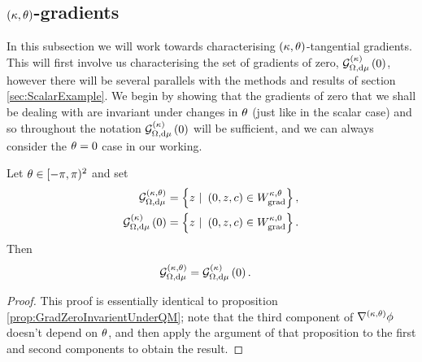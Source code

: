 \subsection{$\left( \kappa,\theta \right)$-gradients} \label{sec:ktGradients}
In this subsection we will work towards characterising $\left( \kappa,\theta \right)$-tangential gradients.
This will first involve us characterising the set of gradients of zero, $\mathcal{G}_{ \Omega, \mathrm{d}\mu}^{(\kappa)}\left( 0 \right)$, however there will be several parallels with the methods and results of section \ref{sec:ScalarExample}. 
We begin by showing that the gradients of zero that we shall be dealing with are invariant under changes in $\theta$ (just like in the scalar case) and so throughout the notation $\mathcal{G}_{ \Omega, \mathrm{d}\mu}^{(\kappa)}\left( 0 \right)$ will be sufficient, and we can always consider the $\theta=0$ case in our working.
\begin{prop} \label{prop:kGradZeroInvarientUnderQM}
	Let $\theta\in[-\pi,\pi)^2$ and set 
	\begin{align*}
		\mathcal{G}^{\kt}_{\ddom, \mathrm{d}\ddmes} &= \clbracs{ z \ \vert \ \bracs{0,z,c}\in W^{\wavenumber, \qm}_{\mathrm{grad}}}, \\
		\kgradZero{\ddom}{\ddmes} &= \clbracs{ z \ \vert \ \bracs{0,z,c}\in W^{\wavenumber, 0}_{\mathrm{grad}}}.
	\end{align*}
	Then
	\begin{align*}
		\mathcal{G}^{\left( \kappa, \theta \right)}_{\Omega, \mathrm{d}\mu} &= \mathcal{G}_{ \Omega, \mathrm{d}\mu}^{(\kappa)}\left( 0 \right).
	\end{align*}
\end{prop}
\begin{proof}
	This proof is essentially identical to proposition \ref{prop:GradZeroInvarientUnderQM}; note that the third component of $\nabla^{\left( \kappa, \theta \right)}\phi$ doesn't depend on $\theta$, and then apply the argument of that proposition to the first and second components to obtain the result.
\end{proof}

